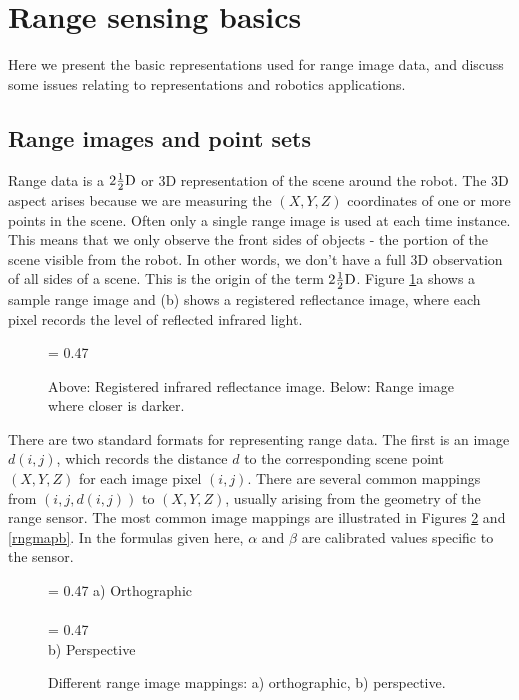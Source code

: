 \documentclass[twocolumn,oneside]{book}
\begin{document}
\section{Range sensing basics \label{sec31.1}}

Here we present the basic representations used for range image data,
and discuss some issues relating to representations and robotics
applications. 

\subsection{Range images and point sets} \label{sec31.1.1}

 Range data is a $2\frac{1}{2}{\rm D}$ or 3D
representation of the scene around the robot.  The 3D aspect arises
because we are measuring the $(X,Y,Z)$ coordinates of one or more
points in the scene.  Often only a single  range
image is used at each time instance.  This means that we only observe
the front sides of objects - the portion of the scene visible from the
robot.  In other words, we don't have a full 3D observation of all
sides of a scene.  This is the origin of the term $2\frac{1}{2}{\rm
  D}$.  Figure \ref{fig23.1}a shows a sample range image and (b) shows
a  registered reflectance image,
where each pixel records the level of reflected infrared light.
\begin{figure}
{\epsfxsize = 0.47\textwidth {}}
\caption{
Above: Registered infrared reflectance image.
Below: Range image where closer is darker.
\label{fig23.1}}
\end{figure}

There are two standard formats for representing range data.
The first is an image $d(i,j)$, which records the distance $d$ to the
corresponding scene point $(X,Y,Z)$ for each image pixel $(i,j)$.
There are several common mappings from $(i,j,d(i,j))$ to $(X,Y,Z)$,
usually arising from the geometry of the range sensor.
The most common image mappings are illustrated in Figures \ref{rngmapa} and
\ref{rngmapb}.
In the formulas given here,
$\alpha$ and $\beta$ are calibrated values specific to the sensor.
\begin{figure}[htb]
{\epsfxsize = 0.47\textwidth {}}
a) Orthographic\\
\ \\
{\epsfxsize = 0.47\textwidth {}}\\
b) Perspective
\caption{Different range image mappings: a) orthographic, b) perspective.
\label{rngmapa}}
\end{figure}
\end{document}
